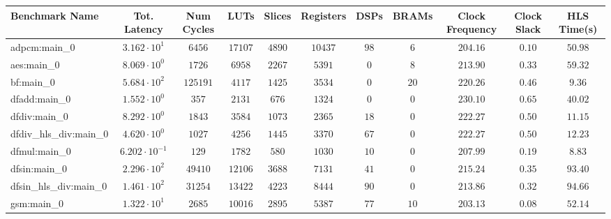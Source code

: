 \begin{tabular}{|l|c|c|c|c|c|c|c|c|c|c|}
\hline
Benchmark Name          & Tot. Latency            & Num Cycles & LUTs       & Slices    & Registers & DSPs    & BRAMs   & Clock Frequency & Clock Slack & HLS Time(s) \\
\hline
adpcm:main\_0           & $ 3.162 \cdot 10^{1}  $ & $ 6456   $ & $ 17107  $ & $ 4890  $ & $ 10437 $ & $ 98  $ & $ 6   $ & $ 204.16      $ & $ 0.10    $ & $ 50.98   $ \\
aes:main\_0             & $ 8.069 \cdot 10^{0}  $ & $ 1726   $ & $ 6958   $ & $ 2267  $ & $ 5391  $ & $ 0   $ & $ 8   $ & $ 213.90      $ & $ 0.33    $ & $ 59.32   $ \\
bf:main\_0              & $ 5.684 \cdot 10^{2}  $ & $ 125191 $ & $ 4117   $ & $ 1425  $ & $ 3534  $ & $ 0   $ & $ 20  $ & $ 220.26      $ & $ 0.46    $ & $ 9.36    $ \\
dfadd:main\_0           & $ 1.552 \cdot 10^{0}  $ & $ 357    $ & $ 2131   $ & $ 676   $ & $ 1324  $ & $ 0   $ & $ 0   $ & $ 230.10      $ & $ 0.65    $ & $ 40.02   $ \\
dfdiv:main\_0           & $ 8.292 \cdot 10^{0}  $ & $ 1843   $ & $ 3584   $ & $ 1073  $ & $ 2365  $ & $ 18  $ & $ 0   $ & $ 222.27      $ & $ 0.50    $ & $ 11.15   $ \\
dfdiv\_hls\_div:main\_0 & $ 4.620 \cdot 10^{0}  $ & $ 1027   $ & $ 4256   $ & $ 1445  $ & $ 3370  $ & $ 67  $ & $ 0   $ & $ 222.27      $ & $ 0.50    $ & $ 12.23   $ \\
dfmul:main\_0           & $ 6.202 \cdot 10^{-1} $ & $ 129    $ & $ 1782   $ & $ 580   $ & $ 1030  $ & $ 10  $ & $ 0   $ & $ 207.99      $ & $ 0.19    $ & $ 8.83    $ \\
dfsin:main\_0           & $ 2.296 \cdot 10^{2}  $ & $ 49410  $ & $ 12106  $ & $ 3688  $ & $ 7131  $ & $ 41  $ & $ 0   $ & $ 215.24      $ & $ 0.35    $ & $ 93.40   $ \\
dfsin\_hls\_div:main\_0 & $ 1.461 \cdot 10^{2}  $ & $ 31254  $ & $ 13422  $ & $ 4223  $ & $ 8444  $ & $ 90  $ & $ 0   $ & $ 213.86      $ & $ 0.32    $ & $ 94.66   $ \\
gsm:main\_0             & $ 1.322 \cdot 10^{1}  $ & $ 2685   $ & $ 10016  $ & $ 2895  $ & $ 5387  $ & $ 77  $ & $ 10  $ & $ 203.13      $ & $ 0.08    $ & $ 52.14   $ \\

\end{tabular}
